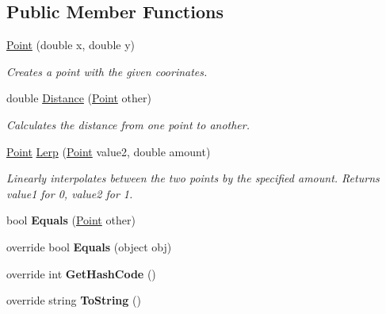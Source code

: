 \subsection*{Public Member Functions}
\begin{DoxyCompactItemize}
\item 
\mbox{\hyperlink{struct_s_g_l_1_1_point_a56c9ba13f3b84483a108ae16fc635cac}{Point}} (double x, double y)
\begin{DoxyCompactList}\small\item\em Creates a point with the given coorinates. \end{DoxyCompactList}\item 
double \mbox{\hyperlink{struct_s_g_l_1_1_point_aa44e48a67f96810b5483955a80426442}{Distance}} (\mbox{\hyperlink{struct_s_g_l_1_1_point}{Point}} other)
\begin{DoxyCompactList}\small\item\em Calculates the distance from one point to another. \end{DoxyCompactList}\item 
\mbox{\hyperlink{struct_s_g_l_1_1_point}{Point}} \mbox{\hyperlink{struct_s_g_l_1_1_point_a4680568d8a9b123e6ffaf27ec22030ff}{Lerp}} (\mbox{\hyperlink{struct_s_g_l_1_1_point}{Point}} value2, double amount)
\begin{DoxyCompactList}\small\item\em Linearly interpolates between the two points by the specified amount. Returns {\itshape value1}  for 0, {\itshape value2}  for 1. \end{DoxyCompactList}\item 
\mbox{\label{struct_s_g_l_1_1_point_a87c11e4e715447147db175bf1542aa9b}} 
bool {\bfseries Equals} (\mbox{\hyperlink{struct_s_g_l_1_1_point}{Point}} other)
\item 
\mbox{\label{struct_s_g_l_1_1_point_acc67f296d3dfae3982f618f9deeaafe7}} 
override bool {\bfseries Equals} (object obj)
\item 
\mbox{\label{struct_s_g_l_1_1_point_a5d9b1d1e671a738b93f8b8d81f755fc6}} 
override int {\bfseries Get\+Hash\+Code} ()
\item 
\mbox{\label{struct_s_g_l_1_1_point_aefc624c50fcac9e87f657e43c39213d6}} 
override string {\bfseries To\+String} ()
\end{DoxyCompactItemize}
